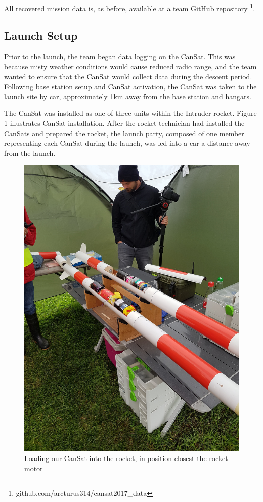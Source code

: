 \documentclass[]{report}
\begin{document}
	All recovered mission data is, as before, available at a team GitHub repository \footnote{github.com/arcturus314/cansat2017\_data}.
	
	\subsection{Launch Setup}
	
	Prior to the launch, the team began data logging on the CanSat. This was because misty weather conditions would cause reduced radio range, and the team wanted to ensure that the CanSat would collect data during the descent period. Following base station setup and CanSat activation, the CanSat was taken to the launch site by car, approximately 1km away from the base station and hangars.
	
	The CanSat was installed as one of three units within the Intruder rocket. Figure \ref{rocket} illustrates CanSat installation. After the rocket technician had installed the CanSats and prepared the rocket, the launch party, composed of one member representing each CanSat during the launch, was led into a car a distance away from the launch.
	
	\begin{figure}[h]
		\hfill\includegraphics[scale=0.1, angle=270]{rocket_load.jpg}\hspace*{\fill}
		\caption{Loading our CanSat into the rocket, in position closest the rocket motor}
		\label{rocket}
	\end{figure}
	
\end{document}
